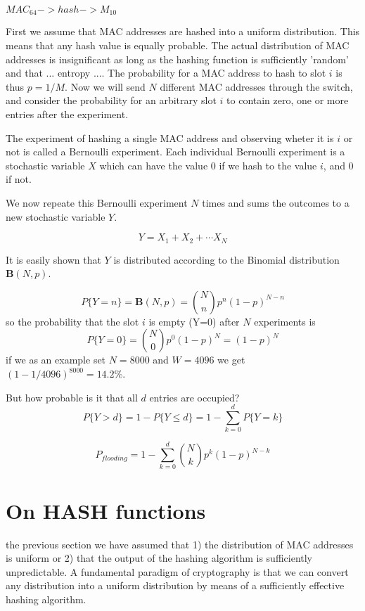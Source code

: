 \documentclass[journal]{IEEEtran}
\begin{document}

$MAC_{64} ->hash->M_{10}$

First we assume that MAC addresses are hashed into a uniform distribution. This means that any hash
value is equally probable. The actual distribution of MAC addresses is insignificant as long as the 
hashing function is sufficiently 'random' and that ... entropy ....
The probability for a MAC address to hash to slot $i$ is thus $p=1/M$. Now we will send $N$ different MAC addresses through
the switch, and
consider the probability for an arbitrary slot $i$ to contain zero, one or more entries after the experiment.

The experiment of hashing a single MAC address and observing wheter it is $i$ or not is called a Bernoulli experiment. 
Each individual Bernoulli experiment is a stochastic
variable $X$ which can have the value 0 if we hash to the value $i$, and 0 if not. 



We now repeate this Bernoulli experiment $N$ times and sums the outcomes to a new stochastic variable $Y$. 

$$
  Y = X_1 + X_2 + \cdots X_N
$$

It is easily shown that $Y$ is distributed according to the Binomial distribution $\mathbf{B}(N,p)$. 




$$
  P\{Y=n\} = \mathbf{B}(N,p) = \binom{N}{n}p^n(1-p)^{N-n}
$$
so the probability that the slot $i$ is empty (Y=0) after $N$ experiments is 
$$
   P\{Y=0\} = \binom{N}{0}p^0(1-p)^N = (1-p)^N
$$
if we as an example set $N=8000$ and $W=4096$ we get $(1-1/4096)^{8000} = 14.2\% $.

But how probable is it that all $d$ entries are occupied?
$$
  P\{Y>d\} = 1-P\{Y\le d\} = 1 - \sum_{k=0}^d P\{Y=k\}
$$

$$
  P_{flooding} = 1- \sum_{k=0}^d \binom{N}{k} p^k (1-p)^{N-k}
$$


\section{On HASH functions}
 the previous section we have assumed that 1) the distribution of 
MAC addresses is uniform or 2) that the output of the hashing algorithm
is sufficiently unpredictable. A fundamental paradigm of cryptography is that we can convert any distribution 
into a uniform distribution by means of a sufficiently effective hashing algorithm.
\end{document}
